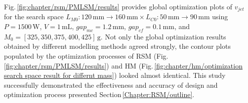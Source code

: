             
            Fig.\,\ref{fig:chapter/rsm/PMLSM/results} provides global optimization plots of $v_{jet}$ for the search space $L_{M0}:120\,\mathrm{mm}\rightarrow 160\,\mathrm{mm} \times L_{C0}:50\,\mathrm{mm}\rightarrow 90\,\mathrm{mm}$ using $P=1500\,\mathrm{W}$, $V=1\,\mathrm{mL}$, $gap_{mc}=1.2\,\mathrm{mm}$, $gap_{cf}=0.1\,\mathrm{mm}$,  and $M_0=[325,350,375,400,425]\,\mathrm{g}$. Not only the global optimization results obtained by different modelling methods agreed strongly, the contour plots populated by the optimization processes of \acs{RSM} (Fig.\,\ref{fig:chapter/rsm/PMLSM/results}) and \acs{HM} (Fig.\,\ref{fig:chapter/hm/optimization search space result for differnt mass}) looked almost identical. This study successfully demonstrated the effectiveness and accuracy of design and optimization process presented Section\,\ref{Chapter:RSM/outline}.
        

